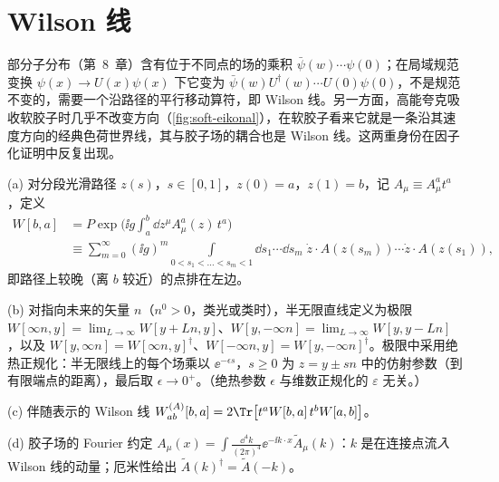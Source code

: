 \section{Wilson 线}\label{sec:prelim-wilson}

部分子分布（第~8~章）含有位于不同点的场的乘积 $\bar\psi(w)\cdots\psi(0)$；在局域规范变换 $\psi(x)\to U(x)\psi(x)$ 下它变为 $\bar\psi(w)U^\dagger(w)\cdots U(0)\psi(0)$，不是规范不变的，需要一个沿路径的平行移动算符，即 Wilson 线。另一方面，高能夸克吸收软胶子时几乎不改变方向（\cref{fig:soft-eikonal}），在软胶子看来它就是一条沿其速度方向的经典色荷世界线，其与胶子场的耦合也是 Wilson 线。这两重身份在因子化证明中反复出现。

\begin{definition}[Wilson 线]\label{def:prelim-wilson}
(a) 对分段光滑路径 $z(s)$，$s\in[0,1]$，$z(0)=a$，$z(1)=b$，记 $A_\mu\equiv A^a_\mu t^a$，定义
\begin{equation}\label{eq:prelim-W}
\begin{aligned}
W[b,a]&=P\exp\Big(\ii g\int_a^b\dd z^\mu A^a_\mu(z)\,t^a\Big)\\
&\equiv\sum_{m=0}^\infty(\ii g)^m\!\!\int\limits_{0<s_1<\dots<s_m<1}\!\!\dd s_1\cdots\dd s_m\;\dot z\cdot A(z(s_m))\cdots\dot z\cdot A(z(s_1)),
\end{aligned}
\end{equation}
即路径上较晚（离 $b$ 较近）的点排在左边。%
\par
(b) 对指向未来的矢量 $n$（$n^0>0$，类光或类时），半无限直线定义为极限 $W[\infty n,y]=\lim_{L\to\infty}W[y+Ln,y]$、$W[y,-\infty n]=\lim_{L\to\infty}W[y,y-Ln]$，以及 $W[y,\infty n]=W[\infty n,y]^\dagger$、$W[-\infty n,y]=W[y,-\infty n]^\dagger$。极限中采用绝热正规化：半无限线上的每个场乘以 $\ee^{-\epsilon s}$，$s\ge0$ 为 $z=y\pm sn$ 中的仿射参数（到有限端点的距离），最后取 $\epsilon\to0^+$。（绝热参数 $\epsilon$ 与维数正规化的 $\varepsilon$ 无关。）
\par
(c) 伴随表示的 Wilson 线 $W^{(A)}_{ab}[b,a]=2\Tr\big[t^aW[b,a]\,t^bW[a,b]\big]$。
\par
(d) 胶子场的 Fourier 约定 $A_\mu(x)=\int\frac{\dd^4k}{(2\pi)^4}\ee^{-\ii k\cdot x}\tilde A_\mu(k)$：$k$ 是在连接点流\emph{入} Wilson 线的动量；厄米性给出 $\tilde A(k)^\dagger=\tilde A(-k)$。
\end{definition}

